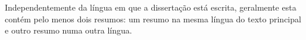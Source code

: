
%

Independentemente da língua em que a dissertação está escrita, geralmente esta contém pelo menos dois resumos: um resumo na mesma língua do texto principal e outro resumo numa outra língua.


%
%

